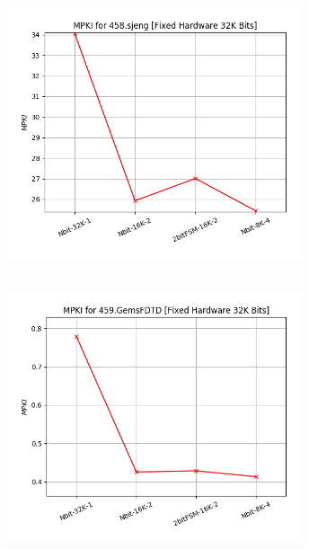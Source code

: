    \begin{minipage}{\textwidth}
      \begin{center}
         \\
         \vspace{3mm}
         \includegraphics[width=0.65\textwidth, frame]{./graphs/4-2ii/458-sjeng.png}
         \vspace{6mm}
      \end{center}
   \end{minipage}

   \begin{minipage}{\textwidth}
      \begin{center}
         \\
         \vspace{3mm}
         \includegraphics[width=0.65\textwidth, frame]{./graphs/4-2ii/459-GemsFDTD.png}
         \vspace{6mm}
      \end{center}
   \end{minipage}

